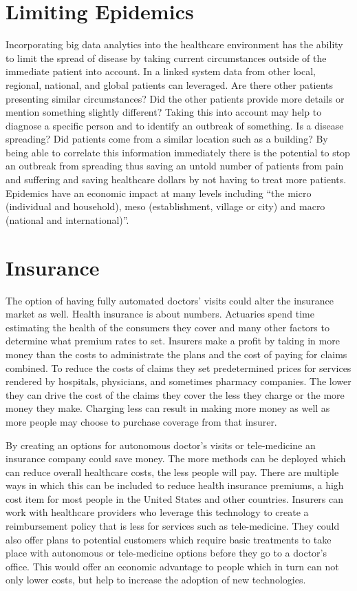 \documentclass[sigconf]{acmart}
\begin{document}
\section{Limiting Epidemics}
Incorporating big data analytics into the healthcare environment has the 
ability to limit the spread of disease by taking current circumstances 
outside of the immediate patient into account.  In a linked system data 
from other local, regional, national, and global patients can leveraged.  
Are there other patients presenting similar circumstances?  Did the other 
patients provide more details or mention something slightly different?  
Taking this into account may help to diagnose a specific person and to 
identify an outbreak of something.  Is a disease spreading?  Did patients 
come from a similar location such as a building?  By being able to 
correlate this information immediately there is the potential to stop an 
outbreak from spreading thus saving an untold number of patients from 
pain and suffering and saving healthcare dollars by not having to treat 
more patients.  Epidemics have an economic impact at many levels 
including ``the micro (individual and household), meso (establishment, 
village or city) and macro (national and 
international)''\cite{WHOResponse}.

\section{Insurance}
The option of having fully automated doctors' visits could alter the 
insurance market as well.  Health insurance is about numbers.  Actuaries 
spend time estimating the health of the consumers they cover and many 
other factors to determine what premium rates to set\cite{Actuary}.  
Insurers make a profit by taking in more money than the costs to 
administrate the plans and the cost of paying for claims combined.  
To reduce the costs of claims they set predetermined prices for services 
rendered by hospitals, physicians, and sometimes pharmacy companies.  
The lower they can drive the cost of the claims they cover the less 
they charge or the more money they make.  Charging less can result in 
making more money as well as more people may choose to purchase 
coverage from that insurer.

By creating an options for autonomous doctor's visits or tele-medicine 
an insurance company could save money.  The more methods can be deployed 
which can reduce overall healthcare costs, the less people will pay.  
There are multiple ways in which this can be included to reduce health 
insurance premiums, a high cost item for most people in the United States 
and other countries.  Insurers can work with healthcare providers who 
leverage this technology to create a reimbursement policy that is less 
for services such as tele-medicine\cite{MedicalEconomics}.  They could 
also offer plans to potential customers which require basic treatments 
to take place with autonomous or tele-medicine options before they go 
to a doctor's office.  This would offer an economic advantage to people 
which in turn can not only lower costs, but help to increase the 
adoption of new technologies.
\end{document}
